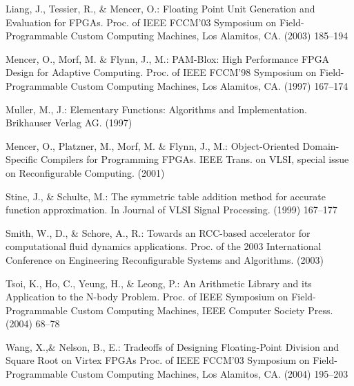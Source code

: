 \documentclass{llncs}
\begin{document}
\begin{thebibliography}{}
Liang, J., Tessier, R., \& Mencer, O.:
Floating Point Unit Generation and Evaluation for FPGAs.
Proc. of IEEE FCCM'03 Symposium on Field-Programmable Custom Computing Machines, Los Alamitos, CA.
(2003) 185--194

Mencer, O., Morf, M. \& Flynn, J., M.:
PAM-Blox: High Performance FPGA Design for Adaptive Computing.
Proc. of IEEE FCCM'98 Symposium on Field-Programmable Custom Computing Machines, Los Alamitos, CA.
(1997) 167--174

Muller, M., J.:
Elementary Functions: Algorithms and Implementation.
Brikhauser Verlag AG.
(1997)



Mencer, O., Platzner, M., Morf, M. \& Flynn, J., M.:
Object-Oriented Domain-Specific Compilers for Programming FPGAs.
IEEE Trans. on VLSI, special issue on Reconfigurable Computing.
(2001)

Stine, J., \& Schulte, M.:
The symmetric table addition method for accurate function approximation.
In Journal of VLSI Signal Processing.
(1999) 167--177

Smith, W., D., \& Schore, A., R.:
Towards an RCC-based accelerator for computational fluid dynamics applications.
Proc. of the 2003 International Conference on Engineering Reconfigurable Systems and Algorithms.
(2003)

Tsoi, K., Ho, C., Yeung, H., \& Leong, P.:
An Arithmetic Library and its Application to the N-body Problem.
Proc. of IEEE Symposium on Field-Programmable Custom Computing Machines, IEEE Computer Society Press.
(2004) 68--78

Wang, X.,\& Nelson, B., E.:
Tradeoffs of Designing Floating-Point Division and Square Root on Virtex FPGAs
Proc. of IEEE FCCM'03 Symposium on Field-Programmable Custom Computing Machines, Los Alamitos, CA.
(2004) 195--203


\end{thebibliography}
\end{document}
